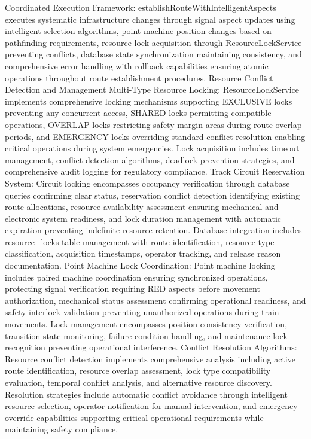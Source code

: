 Coordinated Execution Framework: establishRouteWithIntelligentAspects executes systematic infrastructure changes through signal aspect updates using intelligent selection algorithms, point machine position changes based on pathfinding requirements, resource lock acquisition through ResourceLockService preventing conflicts, database state synchronization maintaining consistency, and comprehensive error handling with rollback capabilities ensuring atomic operations throughout route establishment procedures.
Resource Conflict Detection and Management
Multi-Type Resource Locking: ResourceLockService implements comprehensive locking mechanisms supporting EXCLUSIVE locks preventing any concurrent access, SHARED locks permitting compatible operations, OVERLAP locks restricting safety margin areas during route overlap periods, and EMERGENCY locks overriding standard conflict resolution enabling critical operations during system emergencies. Lock acquisition includes timeout management, conflict detection algorithms, deadlock prevention strategies, and comprehensive audit logging for regulatory compliance.
Track Circuit Reservation System: Circuit locking encompasses occupancy verification through database queries confirming clear status, reservation conflict detection identifying existing route allocations, resource availability assessment ensuring mechanical and electronic system readiness, and lock duration management with automatic expiration preventing indefinite resource retention. Database integration includes resource_locks table management with route identification, resource type classification, acquisition timestamps, operator tracking, and release reason documentation.
Point Machine Lock Coordination: Point machine locking includes paired machine coordination ensuring synchronized operations, protecting signal verification requiring RED aspects before movement authorization, mechanical status assessment confirming operational readiness, and safety interlock validation preventing unauthorized operations during train movements. Lock management encompasses position consistency verification, transition state monitoring, failure condition handling, and maintenance lock recognition preventing operational interference.
Conflict Resolution Algorithms: Resource conflict detection implements comprehensive analysis including active route identification, resource overlap assessment, lock type compatibility evaluation, temporal conflict analysis, and alternative resource discovery. Resolution strategies include automatic conflict avoidance through intelligent resource selection, operator notification for manual intervention, and emergency override capabilities supporting critical operational requirements while maintaining safety compliance.
